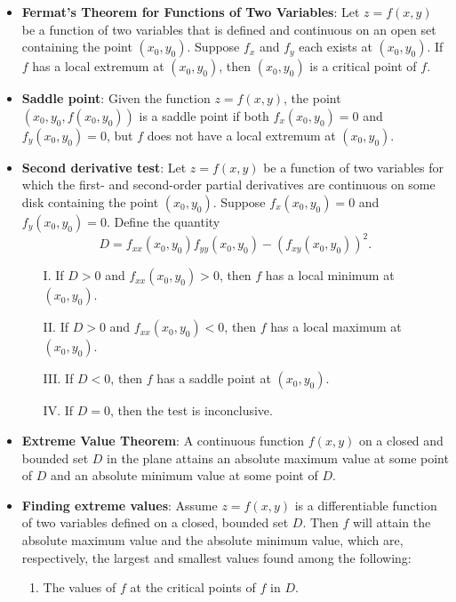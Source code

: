 \documentclass{report}
\begin{document}
\begin{itemize}
    \item \textbf{Fermat’s Theorem for Functions of Two Variables}: 
        Let $z = f(x, y)$ be a function of two variables that is defined and continuous on an open set containing the point $(x_0, y_0)$. Suppose $f_x$ and $f_y$ each exists at $(x_0, y_0)$. If $f$ has a local extremum at $(x_0, y_0)$, then $(x_0, y_0)$ is a critical point of $f$.
    \item \textbf{Saddle point}: Given the function $z = f(x, y)$, the point $(x_0, y_0, f(x_0, y_0))$ is a saddle point if both $f_x(x_0, y_0) = 0$ and $f_y(x_0, y_0) = 0$, but $f$ does not have a local extremum at $(x_0, y_0)$.
    \item \textbf{Second derivative test}:
        Let $z = f(x, y)$ be a function of two variables for which the first- and second-order partial derivatives are continuous on some disk containing the point $(x_0, y_0)$. Suppose $f_x(x_0, y_0) = 0$ and $f_y(x_0, y_0) = 0$. Define the quantity
        \[ D = f_{xx}(x_0, y_0)f_{yy}(x_0, y_0) - (f_{xy}(x_0, y_0))^2. \]
        \begin{enumerate}
            \item[I.] If $D > 0$ and $f_{xx}(x_0, y_0) > 0$, then $f$ has a local minimum at $(x_0, y_0)$.
            \item[II.] If $D > 0$ and $f_{xx}(x_0, y_0) < 0$, then $f$ has a local maximum at $(x_0, y_0)$.
            \item[III.] If $D < 0$, then $f$ has a saddle point at $(x_0, y_0)$.
            \item[IV.] If $D = 0$, then the test is inconclusive.
        \end{enumerate}
        \bigbreak \noindent 
    \item \textbf{Extreme Value Theorem}:
        A continuous function $f(x,y)$ on a closed and bounded set $D$ in the plane attains an absolute maximum value at some point of $D$ and an absolute minimum value at some point of $D$.
    \item \textbf{Finding extreme values}:
        Assume $z=f(x,y)$ is a differentiable function of two variables defined on a closed, bounded set $D$. Then $f$ will attain the absolute maximum value and the absolute minimum value, which are, respectively, the largest and smallest values found among the following:
        \begin{enumerate}
            \item The values of $f$ at the critical points of $f$ in $D$.

\end{enumerate}
\end{itemize}
\end{document}
